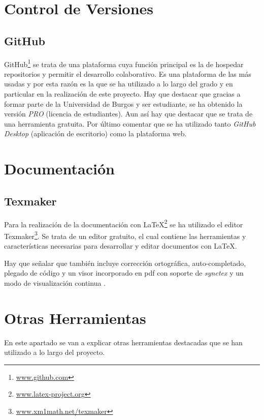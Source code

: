 \section{Control de Versiones}\label{control_de_versiones}
\subsection{GitHub}\label{gitHub}
GitHub\footnote{\href {https://github.com/}{www.github.com}} se trata de una plataforma cuya función principal es la de hospedar repositorios y permitir el desarrollo colaborativo.
Es una plataforma de las más usadas y por esta razón es la que se ha utilizado a lo largo del grado y en particular en la realización de este proyecto. Hay que destacar que gracias a formar parte de la Universidad de Burgos y ser estudiante, se ha obtenido la versión \emph{PRO} (licencia de estudiantes). Aun así hay que destacar que se trata de una herramienta gratuita.
Por último comentar que se ha utilizado tanto \emph{GitHub Desktop} (aplicación de escritorio) como la plataforma web.



\section{Documentación}\label{documentacion}

\subsection{Texmaker}\label{texmaker}
Para la realización de la documentación con \LaTeX\footnote{\href {https://www.latex-project.org/}{www.latex-project.org}} se ha utilizado el editor Texmaker\footnote{\href {https://www.xm1math.net/texmaker/}{www.xm1math.net/texmaker}}. Se trata de un editor gratuito, el cual contiene las herramientas y características necesarias para desarrollar y editar documentos con \LaTeX.

Hay que señalar que también incluye corrección ortográfica, auto-completado, plegado de código y un visor incorporado en pdf con soporte de \emph{synctex} y un modo de visualización continua \cite{texmaker}. 



\section{Otras Herramientas}\label{otras_herramientas}
En este apartado se van a explicar otras herramientas destacadas que se han utilizado a lo largo del proyecto.


